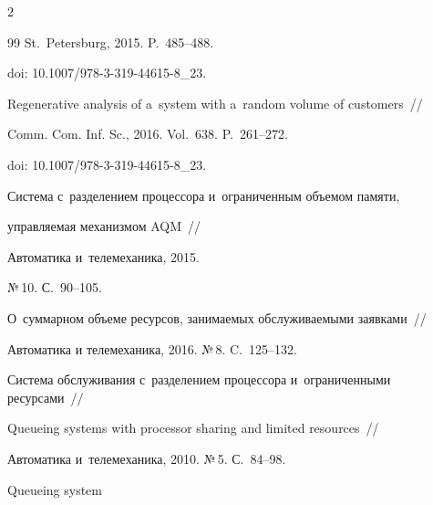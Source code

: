 \begin{multicols}{2}
{{\begin{thebibliography}{99}
St.\ Petersburg, 2015. P.~485--488.


doi: 10.1007/978-3-319-44615-8\_23.









Regenerative analysis of a~system with a~random volume of customers~// 


Comm. Com. Inf. Sc., 2016. Vol.~638. P.~261--272.


doi: 10.1007/978-3-319-44615-8\_23.





















Система с~разделением процессора и~ограниченным объемом памяти,


управ\-ля\-емая механизмом AQM~//


Автоматика и~телемеханика, 2015.


№\,10. С.~90--105.









О~суммарном объеме ресурсов, занимаемых обслуживаемыми заявками~// 


Автоматика и телемеханика, 2016. №\,8. C.~125--132.









Система обслуживания с~разделением процессора и~ограниченными ресурсами~//


Queueing systems with processor sharing and limited resources~// 


Автоматика и~телемеханика, 2010. №\,5. С.~84--98.







 Queueing system 



\end{thebibliography}}}
\end{multicols}
